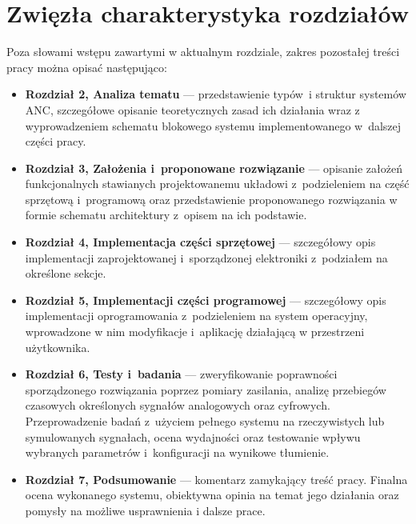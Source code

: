 \section{Zwięzła charakterystyka rozdziałów}
Poza słowami wstępu zawartymi w aktualnym rozdziale, zakres pozostałej treści
pracy można opisać następująco:
\begin{itemize}

    \item \textbf{Rozdział 2, Analiza tematu} --- przedstawienie typów~i
    struktur systemów ANC, szczegółowe opisanie teoretycznych zasad ich
    działania wraz z wyprowadzeniem schematu blokowego systemu implementowanego
    w~dalszej części pracy.

    \item \textbf{Rozdział 3, Założenia i~proponowane rozwiązanie} --- opisanie
    założeń funkcjonalnych stawianych projektowanemu układowi z~podzieleniem na
    część sprzętową i~programową oraz przedstawienie proponowanego rozwiązania w
    formie schematu architektury z~opisem na ich podstawie.

    \item \textbf{Rozdział 4, Implementacja części sprzętowej} --- szczegółowy
    opis implementacji zaprojektowanej i~sporządzonej elektroniki z~podziałem na
    określone sekcje.

    \item \textbf{Rozdział 5, Implementacji części programowej} --- szczegółowy
    opis implementacji oprogramowania z~podzieleniem na system operacyjny,
    wprowadzone w nim modyfikacje i~aplikację działającą w przestrzeni
    użytkownika.

    \item \textbf{Rozdział 6, Testy i~badania} --- zweryfikowanie poprawności
    sporządzonego rozwiązania poprzez pomiary zasilania, analizę przebiegów
    czasowych określonych sygnałów analogowych oraz cyfrowych. Przeprowadzenie
    badań z~użyciem pełnego systemu na rzeczywistych lub symulowanych sygnałach,
    ocena wydajności oraz testowanie wpływu wybranych parametrów i~konfiguracji
    na wynikowe tłumienie.

    \item \textbf{Rozdział 7, Podsumowanie} --- komentarz zamykający treść
    pracy. Finalna ocena wykonanego systemu, obiektywna opinia na temat jego
    działania oraz pomysły na możliwe usprawnienia i dalsze prace.

\end{itemize}
